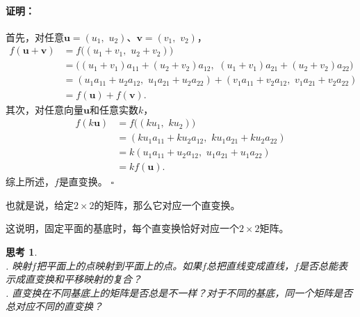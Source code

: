 \documentclass[12pt,UTF8]{ctexbook}
\renewenvironment{proof}{\paragraph{\textbf{证明：}}}{\hfill$\square$}
\newtheorem{sk}{思考}[section]
\begin{document}
\begin{proof}
    首先，对任意$\mathbf{u} = (u_1,\,\, u_2)$、$\mathbf{v} = (v_1,\,\,v_2)$，
    \begin{align*}
        f (\mathbf{u} + \mathbf{v}) &= f \big((u_1 + v_1,\,\, u_2 + v_2)\big)  \\
        &= \Big((u_1 + v_1)a_{11} + (u_2 + v_2)a_{12},\,\,(u_1 + v_1)a_{21} + (u_2 + v_2)a_{22}\Big) \\
        &= (u_1a_{11} + u_2a_{12},\,\,u_1a_{21} + u_2a_{22}) + (v_1a_{11} + v_2a_{12},\,\,v_1a_{21} + v_2a_{22}) \\
        &= f (\mathbf{u}) + f (\mathbf{v}). 
    \end{align*}
    其次，对任意向量$\mathbf{u}$和任意实数$k$，
    \begin{align*}
        f (k\mathbf{u}) &= f \big((ku_1,\,\, ku_2)\big)  \\
        &= (ku_1a_{11} + ku_2a_{12},\,\,ku_1a_{21} + ku_2a_{22}) \\
        &= k(u_1a_{11} + u_2a_{12},\,\,u_1a_{21} + u_1a_{22}) \\
        &= kf (\mathbf{u}). 
    \end{align*}  
    综上所述，$f$是直变换。
\end{proof}

也就是说，给定$2\times 2$的矩阵，那么它对应一个直变换。

这说明，固定平面的基底时，每个直变换恰好对应一个$2\times 2$矩阵。

\begin{sk}
    \mbox{} \\
    . 映射$f$把平面上的点映射到平面上的点。如果$f$总把直线变成直线，$f$是否总能表示成直变换和平移映射的复合？\\
    . 直变换在不同基底上的矩阵是否总是不一样？对于不同的基底，同一个矩阵是否总对应不同的直变换？
\end{sk}
\end{document}
